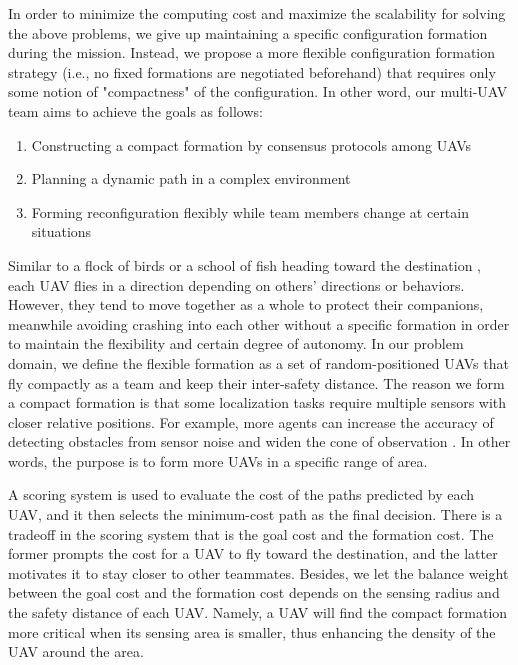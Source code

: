 In order to minimize the computing cost and maximize the scalability for solving the above problems, we give up maintaining a specific configuration formation during the mission. Instead, we propose a more flexible configuration formation strategy (i.e., no fixed formations are negotiated beforehand) that requires only some notion of "compactness" of the configuration. In other word, our multi-UAV team aims to achieve the goals as follows:
\begin{enumerate}
\item Constructing a compact formation by consensus protocols among UAVs
\item Planning a dynamic path in a complex environment
\item Forming reconfiguration flexibly while team members change at certain situations
\end{enumerate}

Similar to a flock of birds or a school of fish heading toward the destination \citep{hubbard2004model}, each UAV flies in a direction depending on others' directions or behaviors. However, they tend to move together as a whole to protect their companions, meanwhile avoiding crashing into each other without a specific formation in order to maintain the flexibility and certain degree of autonomy. In our problem domain, we define the flexible formation as a set of random-positioned UAVs that fly compactly as a team and keep their inter-safety distance. The reason we form a compact formation is that some localization tasks require multiple sensors with closer relative positions. For example, more agents can increase the accuracy of detecting obstacles from sensor noise and widen the cone of observation \citep{anderson2008uav}. In other words, the purpose is to form more UAVs in a specific range of area.

A scoring system is used to evaluate the cost of the paths predicted by each UAV, and it then selects the minimum-cost path as the final decision. There is a tradeoff in the scoring system that is the goal cost and the formation cost. The former prompts the cost for a UAV to fly toward the destination, and the latter motivates it to stay closer to other teammates. Besides, we let the balance weight between the goal cost and the formation cost depends on the sensing radius and the safety distance of each UAV. Namely, a UAV will find the compact formation more critical when its sensing area is smaller, thus enhancing the density of the UAV around the area.

